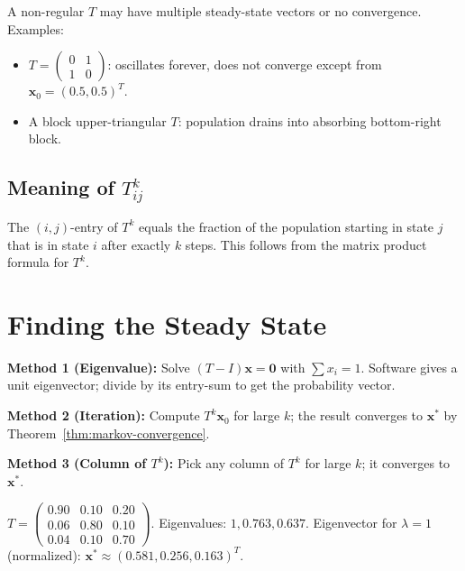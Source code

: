 \begin{remark}
A non-regular $T$ may have multiple steady-state vectors or no convergence. Examples:
\begin{itemize}
  \item $T=\begin{pmatrix}0&1\\1&0\end{pmatrix}$: oscillates forever, does not converge except from $\mathbf{x}_0=(0.5,0.5)^T$.
  \item A block upper-triangular $T$: population drains into absorbing bottom-right block.
\end{itemize}
\end{remark}

\subsection*{Meaning of $T^k_{ij}$}

The $(i,j)$-entry of $T^k$ equals the fraction of the population starting in state $j$ that is in state $i$ after exactly $k$ steps. This follows from the matrix product formula for $T^k$.

\section{Finding the Steady State}

\textbf{Method 1 (Eigenvalue):} Solve $(T-I)\mathbf{x}=\mathbf{0}$ with $\sum x_i=1$. Software gives a unit eigenvector; divide by its entry-sum to get the probability vector.

\textbf{Method 2 (Iteration):} Compute $T^k\mathbf{x}_0$ for large $k$; the result converges to $\mathbf{x}^*$ by Theorem~\ref{thm:markov-convergence}.

\textbf{Method 3 (Column of $T^k$):} Pick any column of $T^k$ for large $k$; it converges to $\mathbf{x}^*$.

\begin{example}
$T=\begin{pmatrix}0.90&0.10&0.20\\0.06&0.80&0.10\\0.04&0.10&0.70\end{pmatrix}$.
Eigenvalues: $1, 0.763, 0.637$. Eigenvector for $\lambda=1$ (normalized): $\mathbf{x}^*\approx(0.581, 0.256, 0.163)^T$.
\end{example}

